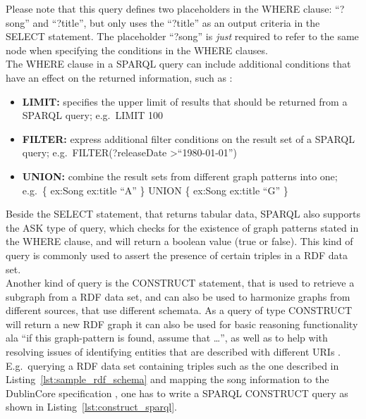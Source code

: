 
Please note that this query defines two placeholders in the WHERE clause: ``?song'' and ``?title'', but only uses the ``?title'' as an output criteria in the SELECT statement. The placeholder ``?song'' is \emph{just} required to refer to the same node when specifying the conditions in the WHERE clauses. \\

The WHERE clause in a \gls{SPARQL} query can include additional conditions that have an effect on the returned information, such as \citep[pg. 66-112]{allemang2011semantic}: \@

\begin{itemize}
	\item \textbf{LIMIT:} specifies the upper limit of results that should be returned from a \gls{SPARQL} query; e.g.\ LIMIT 100
	\item \textbf{FILTER:} express additional filter conditions on the result set of a \gls{SPARQL} query; e.g.\ FILTER(?releaseDate \textgreater ``1980-01-01'')
	\item \textbf{UNION:} combine the result sets from different graph patterns into one; e.g.\ \{ ex:Song ex:title ``A'' \} UNION \{ ex:Song ex:title ``G'' \}
\end{itemize}

Beside the SELECT statement, that returns tabular data, \gls{SPARQL} also supports the ASK type of query, which checks for the existence of graph patterns stated in the WHERE clause, and will return a boolean value (true or false). This kind of query is commonly used to assert the presence of certain triples in a \gls{RDF} data set. \\

Another kind of query is the CONSTRUCT statement, that is used to retrieve a subgraph from a \gls{RDF} data set, and can also be used to harmonize graphs from different sources, that use different schemata. As a query of type CONSTRUCT will return a new \gls{RDF} graph it can also be used for basic reasoning functionality ala ``if this graph-pattern is found, assume that \ldots'', as well as to help with resolving issues of identifying entities that are described with different \gls{URI}s \citep[pg. 88-98]{allemang2011semantic}.
E.g.\ querying a \gls{RDF} data set containing triples such as the one described in Listing~\ref{lst:sample_rdf_schema} and mapping the song information to the DublinCore specification \citep{DublinCore}, one has to write a \gls{SPARQL} CONSTRUCT query as shown in Listing~\ref{lst:construct_sparql}. \\

